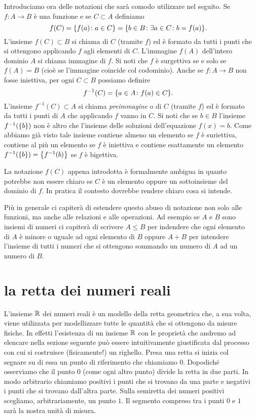 Introduciamo ora delle notazioni che sarà comodo utilizzare nel seguito.
Se $f\colon A \to B$ è una funzione e se $C\subset A$ definiamo
\[
  f(C) = {\left\{ f(a)\colon a \in C \right\}} = {\left\{ b\in B\colon \exists a\in C\colon b=f(a) \right\}}.
\]
L'insieme $f(C)\subset B$ si chiama 
%
di $C$ (tramite $f$) ed è formato
da tutti i punti che si ottengono applicando $f$ agli elementi di $C$.
L'immagine $f(A)$ dell'intero dominio $A$ si chiama immagine di $f$.
Si noti che $f$ è surgettiva se e solo se $f(A)=B$ (cioè se l'immagine coincide
col codominio).
Anche se $f\colon A \to B$ non fosse iniettiva,
per ogni $C\subset B$ possiamo definire
\[
  f^{-1}(C) = {\left\{ a\in A\colon f(a) \in C \right\}}.
\]
L'insieme $f^{-1}(C)\subset A$ si chiama \emph{preimmagine}
o 
%
di $C$ (tramite $f$)
ed è formato da tutti i punti di $A$ che applicando $f$ vanno in $C$.
Si noti che se $b\in B$ l'insieme $f^{-1}({\left\{ b \right\}})$ non è altro che
l'insieme delle soluzioni dell'equazione $f(x)=b$. Come abbiamo
già visto tale insieme contiene almeno un elemento se $f$ è suriettiva,
contiene al più un elemento se $f$ è iniettiva e contiene esattamente
un elemento $f^{-1}({\left\{ b \right\}}) = {\left\{ f^{-1}(b) \right\}}$ se $f$ è bigettiva.

La notazione $f(C)$ appena introdotta è formalmente ambigua in quanto
potrebbe non essere chiaro se $C$ è un elemento oppure un sottoinsieme
del dominio di $f$.
In pratica il contesto dovrebbe rendere chiaro cosa si intende.

Più in generale ci capiterà di estendere questo abuso di notazione non solo
alle funzioni, ma anche alle relazioni e alle operazioni.
Ad esempio se $A$ e $B$ sono insiemi di numeri ci capiterà di scrivere $A\le B$
per indendere che ogni elemento di $A$ è minore o uguale ad ogni elemento di $B$
oppure $A+B$ per intendere l'insieme di tutti i numeri che si ottengono sommando
un numero di $A$ ad un numero di $B$.

\section{la retta dei numeri reali}
\label{sec:reali}

L'insieme $\mathbb R$ dei numeri reali è un modello della retta geometrica che,
a sua volta, viene utilizzata per modellizzare tutte le quantità che si ottengono
da misure fisiche.
In effetti l'esistenza di un insieme $\mathbb R$ con le proprietà
che andremo ad elencare nella sezione seguente
può essere intuitivamente giustificata dal processo con cui
si costruisce (fisicamente!) un righello. Presa una retta si inizia col segnare
su di essa un punto di riferimento che chiamiamo $0$. Dopodiché osserviamo che
il punto $0$ (come ogni altro punto) divide la retta in due parti. In modo arbitrario
chiamiamo positivi i punti che si trovano da una parte e negativi i punti che
si trovano dall'altra parte. Sulla semiretta dei numeri positivi scegliamo, arbitrariamente,
un punto $1$. Il segmento compreso tra i punti $0$ e $1$ sarà la nostra unità di
misura.

